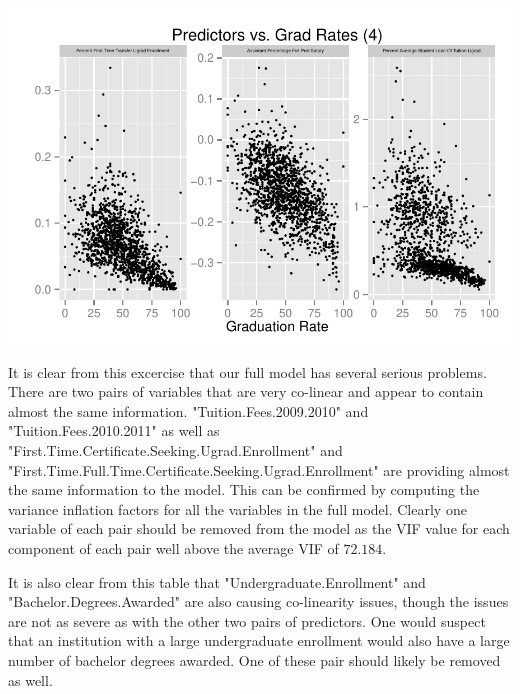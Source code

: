 \documentclass{article}
\begin{document}
\includegraphics{Fig-scatter4}

\FloatBarrier

It is clear from this excercise that our full model has several serious problems. There are two pairs of variables that are very co-linear and appear to contain almost the same information. "Tuition.Fees.2009.2010" and "Tuition.Fees.2010.2011" as well as "First.Time.Certificate.Seeking.Ugrad.Enrollment" and "First.Time.Full.Time.Certificate.Seeking.Ugrad.Enrollment" are providing almost the same information to the model. This can be confirmed by computing the variance inflation factors for all the variables in the full model. Clearly one variable of each pair should be removed from the model as the VIF value for each component of each pair well above the average VIF of $72.184$.

It is also clear from this table that "Undergraduate.Enrollment" and "Bachelor.Degrees.Awarded" are also causing co-linearity issues, though the issues are not as severe as with the other two pairs of predictors. One would suspect that an institution with a large undergraduate enrollment would also have a large number of bachelor degrees awarded. One of these pair should likely be removed as well.
\end{document}
